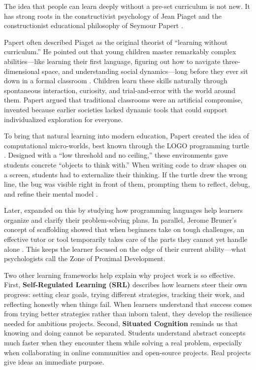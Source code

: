 \documentclass[11pt]{article}
\begin{document}
The idea that people can learn deeply without a pre-set curriculum is not new. It has strong roots in the constructivist psychology of Jean Piaget and the constructionist educational philosophy of Seymour Papert \citep{piaget1970,papert1980}. 

Papert often described Piaget as the original theorist of ``learning without curriculum.'' He pointed out that young children master remarkably complex abilities---like learning their first language, figuring out how to navigate three-dimensional space, and understanding social dynamics---long before they ever sit down in a formal classroom \citep{papert1980}. Children learn these skills naturally through spontaneous interaction, curiosity, and trial-and-error with the world around them. Papert argued that traditional classrooms were an artificial compromise, invented because earlier societies lacked dynamic tools that could support individualized exploration for everyone.

To bring that natural learning into modern education, Papert created the idea of computational micro-worlds, best known through the LOGO programming turtle \citep{papert1980}. Designed with a ``low threshold and no ceiling,'' these environments gave students concrete ``objects to think with.'' When writing code to draw shapes on a screen, students had to externalize their thinking. If the turtle drew the wrong line, the bug was visible right in front of them, prompting them to reflect, debug, and refine their mental model \citep{resnick2017}.

Later, \citet{pea1985} expanded on this by studying how programming languages help learners organize and clarify their problem-solving plans. In parallel, Jerome Bruner’s concept of scaffolding showed that when beginners take on tough challenges, an effective tutor or tool temporarily takes care of the parts they cannot yet handle alone \citep{wood1976}. This keeps the learner focused on the edge of their current ability---what psychologists call the Zone of Proximal Development.

Two other learning frameworks help explain why project work is so effective. First, \textbf{Self-Regulated Learning (SRL)} \citep{zimmerman2002} describes how learners steer their own progress: setting clear goals, trying different strategies, tracking their work, and reflecting honestly when things fail. When learners understand that success comes from trying better strategies rather than inborn talent, they develop the resilience needed for ambitious projects. Second, \textbf{Situated Cognition} \citep{lave1991} reminds us that knowing and doing cannot be separated. Students understand abstract concepts much faster when they encounter them while solving a real problem, especially when collaborating in online communities and open-source projects. Real projects give ideas an immediate purpose.
\end{document}
